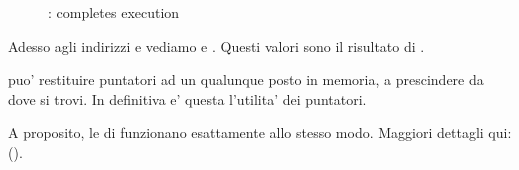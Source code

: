 \begin{figure}[H]
\centering
{}
\caption{\olly: \ttfone completes execution}
\label{fig:pointers_olly_stk_3}
\end{figure}

Adesso agli indirizzi  e  vediamo  e .
Questi valori sono il risultato di \ttfone.

\sectionold{\Conclusione{}}
 
\ttfone puo' restituire puntatori ad un qualunque posto in memoria, a prescindere da dove si trovi.
In definitiva e' questa l'utilita' dei puntatori.

A proposito, le  di \Cpp funzionano esattamente allo stesso modo.
Maggiori dettagli qui: ().
